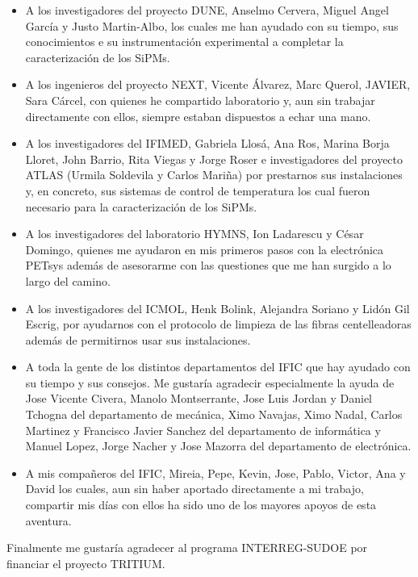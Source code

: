 \begin{itemize}

\item{} A los investigadores del proyecto DUNE, Anselmo Cervera, Miguel Angel García y Justo Martin-Albo, los cuales me han ayudado con su tiempo, sus conocimientos e su instrumentación experimental a completar la caracterización de los SiPMs. 

\item{} A los ingenieros del proyecto NEXT, Vicente Álvarez, Marc Querol, JAVIER, Sara Cárcel, con quienes he compartido laboratorio y, aun sin trabajar directamente con ellos, siempre estaban dispuestos a echar una mano. 

\item{} A los investigadores del IFIMED, Gabriela Llosá, Ana Ros, Marina Borja Lloret, John Barrio, Rita Viegas y Jorge Roser e investigadores del proyecto ATLAS (Urmila Soldevila y Carlos Mariña) por prestarnos sus instalaciones y, en concreto, sus sistemas de control de temperatura los cual fueron necesario para la caracterización de los SiPMs. 

\item{} A los investigadores del laboratorio HYMNS, Ion Ladarescu y César Domingo, quienes me ayudaron en mis primeros pasos con la electrónica PETsys además de asesorarme con las questiones que me han surgido a lo largo del camino.

\item{} A los investigadores del ICMOL, Henk Bolink, Alejandra Soriano y Lidón Gil Escrig, por ayudarnos con el protocolo de limpieza de las fibras centelleadoras además de permitirnos usar sus instalaciones.

\item{} A toda la gente de los distintos departamentos del IFIC que hay ayudado con su tiempo y sus consejos. Me gustaría agradecir especialmente la ayuda de Jose Vicente Civera, Manolo Montserrante, Jose Luis Jordan y Daniel Tchogna del departamento de mecánica, Ximo Navajas, Ximo Nadal, Carlos Martinez y Francisco Javier Sanchez del departamento de informática y Manuel Lopez, Jorge Nacher y Jose Mazorra del departamento de electrónica.

\item{} A mis compañeros del IFIC, Mireia, Pepe, Kevin, Jose, Pablo, Victor, Ana y David los cuales, aun sin haber aportado directamente a mi trabajo, compartir mis días con ellos ha sido uno de los mayores apoyos de esta aventura.

\end{itemize} 

Finalmente me gustaría agradecer al programa INTERREG-SUDOE por financiar el proyecto TRITIUM.